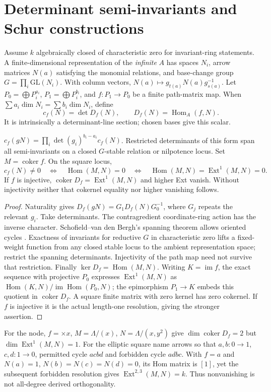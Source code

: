 \chapter{Determinant semi-invariants and Schur constructions}
Assume $k$ algebraically closed of characteristic zero for invariant-ring statements. A finite-dimensional representation of the \emph{infinite} $A$ has spaces $N_i$, arrow matrices $N(a)$ satisfying the monomial relations, and base-change group $G=\prod_i\mathrm{GL}(N_i)$. With column vectors, $N(a)\mapsto g_{t(a)}N(a)g_{s(a)}^{-1}$. Let $P_0=\bigoplus P_i^{a_i}$, $P_1=\bigoplus P_i^{b_i}$, and $f:P_1\to P_0$ be a finite path-matrix map. When $\sum a_i\dim N_i=\sum b_i\dim N_i$, define
\[
 c_f(N)=\det D_f(N),\qquad D_f(N)=\operatorname{Hom}_A(f,N).
\]
It is intrinsically a determinant-line section; chosen bases give this scalar.
\begin{proposition}\label{thm:semi}
$c_f(gN)=\prod_i\det(g_i)^{b_i-a_i}c_f(N)$. Restricted determinants of this form span all semi-invariants on a closed $G$-stable relation or nilpotence locus. Set $M=\operatorname{coker}f$. On the square locus,
\[
 c_f(N)\ne0\quad\Longleftrightarrow\quad\operatorname{Hom}(M,N)=0
 \quad\Longleftrightarrow\quad\operatorname{Hom}(M,N)=\operatorname{Ext}^1(M,N)=0.
\]
If $f$ is injective, $\operatorname{coker}D_f=\operatorname{Ext}^1(M,N)$ and higher Ext vanish. Without injectivity neither that cokernel equality nor higher vanishing follows.
\end{proposition}
\begin{proof}
Naturality gives $D_f(gN)=G_1D_f(N)G_0^{-1}$, where $G_j$ repeats the relevant $g_i$. Take determinants. The contragredient coordinate-ring action has the inverse character. Schofield--van den Bergh's spanning theorem allows oriented cycles \cite[Theorem2.3]{SchofieldVdB}. Exactness of invariants for reductive $G$ in characteristic zero lifts a fixed-weight function from any closed stable locus to the ambient representation space; restrict the spanning determinants. Injectivity of the path map need not survive that restriction. Finally $\ker D_f=\operatorname{Hom}(M,N)$. Writing $K=\operatorname{im}f$, the exact sequence with projective $P_0$ expresses $\operatorname{Ext}^1(M,N)$ as $\operatorname{Hom}(K,N)/\operatorname{im}\operatorname{Hom}(P_0,N)$; the epimorphism $P_1\to K$ embeds this quotient in $\operatorname{coker}D_f$. A square finite matrix with zero kernel has zero cokernel. If $f$ is injective it is the actual length-one resolution, giving the stronger assertion.
\end{proof}
For the node, $f=\times x$, $M=\Lambda/(x)$, $N=\Lambda/(x,y^2)$ give $\dim\operatorname{coker}D_f=2$ but $\dim\operatorname{Ext}^1(M,N)=1$. For the elliptic square name arrows so that $a,b:0\to1$, $c,d:1\to0$, permitted cycle $acbd$ and forbidden cycle $adbc$. With $f=a$ and $N(a)=1$, $N(b)=N(c)=N(d)=0$, its Hom matrix is $[1]$, yet the subsequent forbidden resolution gives $\operatorname{Ext}^{2,3}(M,N)=k$. Thus nonvanishing is not all-degree derived orthogonality.

